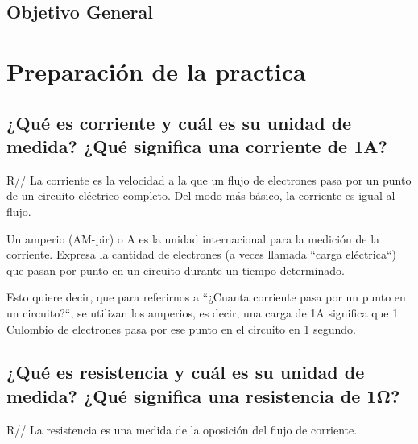 \documentclass[letterpaper, 12pt]{report}
\begin{document}
\subsection{Objetivo General}

\section{Preparación de la practica}

\subsection{¿Qué es corriente y cuál es su unidad de medida? ¿Qué significa
	una corriente de 1A?}

R// La corriente es la velocidad a la que un flujo de electrones pasa por un
punto de un circuito eléctrico completo. Del modo más básico,
la corriente es igual al flujo.~\cite{DefinicionCorrientePlusAmperio}

\vspace{.5cm}

Un amperio (AM-pir) o A es la unidad internacional para la medición de la
corriente. Expresa la cantidad de electrones
(a veces llamada ``carga eléctrica``) que pasan por punto en un circuito
durante un tiempo determinado.~\cite{DefinicionCorrientePlusAmperio}

\vspace{.5cm}

Esto quiere decir, que para referirnos a ``¿Cuanta corriente pasa por un
punto en un circuito?``, se utilizan los amperios, es decir, una carga de 1A
significa que 1 Culombio de electrones pasa por ese punto en el circuito en
1 segundo.~\cite{DefinicionCorrientePlusAmperio}

\subsection{¿Qué es resistencia y cuál es su unidad de medida? ¿Qué
	significa una resistencia de 1Ω?}

R// La resistencia es una medida de la oposición del flujo de corriente.
~\cite{DefinicionResistenciaPlusOhmios}

\vspace{.5cm}
\end{document}
